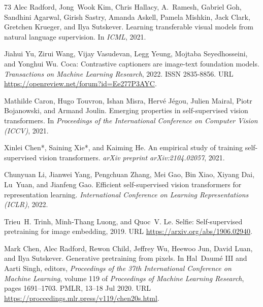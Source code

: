 \documentclass{article}
\begin{document}
\begin{thebibliography}{73}
Alec Radford, Jong~Wook Kim, Chris Hallacy, A.~Ramesh, Gabriel Goh, Sandhini
  Agarwal, Girish Sastry, Amanda Askell, Pamela Mishkin, Jack Clark, Gretchen
  Krueger, and Ilya Sutskever.
\newblock Learning transferable visual models from natural language
  supervision.
\newblock In \emph{ICML}, 2021.

Jiahui Yu, Zirui Wang, Vijay Vasudevan, Legg Yeung, Mojtaba Seyedhosseini, and
  Yonghui Wu.
\newblock Coca: Contrastive captioners are image-text foundation models.
\newblock \emph{Transactions on Machine Learning Research}, 2022.
\newblock ISSN 2835-8856.
\newblock URL \url{https://openreview.net/forum?id=Ee277P3AYC}.

Mathilde Caron, Hugo Touvron, Ishan Misra, Herv\'e J\'egou, Julien Mairal,
  Piotr Bojanowski, and Armand Joulin.
\newblock Emerging properties in self-supervised vision transformers.
\newblock In \emph{Proceedings of the International Conference on Computer
  Vision (ICCV)}, 2021.

Xinlei Chen*, Saining Xie*, and Kaiming He.
\newblock An empirical study of training self-supervised vision transformers.
\newblock \emph{arXiv preprint arXiv:2104.02057}, 2021.

Chunyuan Li, Jianwei Yang, Pengchuan Zhang, Mei Gao, Bin Xiao, Xiyang Dai,
  Lu~Yuan, and Jianfeng Gao.
\newblock Efficient self-supervised vision transformers for representation
  learning.
\newblock \emph{International Conference on Learning Representations (ICLR)},
  2022.

Trieu~H. Trinh, Minh-Thang Luong, and Quoc~V. Le.
\newblock Selfie: Self-supervised pretraining for image embedding, 2019.
\newblock URL \url{https://arxiv.org/abs/1906.02940}.

Mark Chen, Alec Radford, Rewon Child, Jeffrey Wu, Heewoo Jun, David Luan, and
  Ilya Sutskever.
\newblock Generative pretraining from pixels.
\newblock In Hal~Daumé III and Aarti Singh, editors, \emph{Proceedings of the
  37th International Conference on Machine Learning}, volume 119 of
  \emph{Proceedings of Machine Learning Research}, pages 1691--1703. PMLR,
  13--18 Jul 2020.
\newblock URL \url{https://proceedings.mlr.press/v119/chen20s.html}.


\end{thebibliography}
\end{document}
